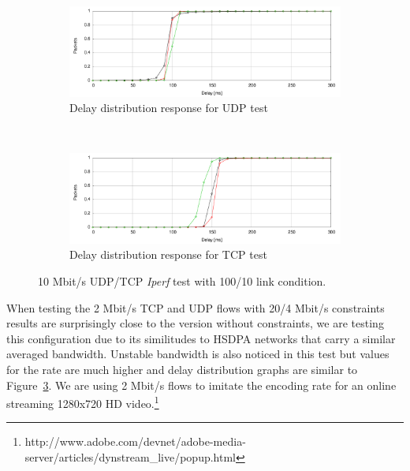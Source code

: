 \begin{figure}
        \centering
        \begin{subfigure}[b]{0.5\textwidth}
                \centering
                \includegraphics[width=\textwidth]{./figures/10m_udp_total_delay_distribution.pdf}
                \caption{Delay distribution response for UDP test}
                \label{fig:10m_udp_total_delay_distribution}
        \end{subfigure}%
        ~ %
        \begin{subfigure}[b]{0.5\textwidth}
                \centering
                \includegraphics[width=\textwidth]{./figures/10m_tcp_total_delay_distribution.pdf}
                \caption{Delay distribution response for TCP test}
                \label{fig:10m_tcp_total_delay_distribution}
        \end{subfigure}
        \caption[10 Mbit/s UDP/TCP {\it Iperf} test with 100/10 link condition]{10 Mbit/s UDP/TCP {\it Iperf} test with 100/10 link condition.}
        \label{fig:10m_tcp_udp_distribution}
\end{figure}

When testing the 2 Mbit/s TCP and UDP flows with 20/4 Mbit/s constraints results are surprisingly close to the version without constraints, we are testing this configuration due to its similitudes to HSDPA networks that carry a similar averaged bandwidth. Unstable bandwidth is also noticed in this test but values for the rate are much higher and delay distribution graphs are similar to Figure~\ref{fig:10m_tcp_udp_distribution}. We are using 2 Mbit/s flows to imitate the encoding rate for an online streaming 1280x720 HD video.\footnote{http://www.adobe.com/devnet/adobe-media-server/articles/dynstream_live/popup.html}

